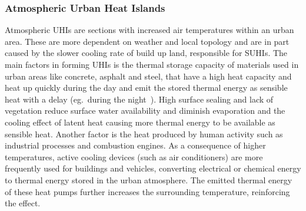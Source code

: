 \documentclass[12pt,a4paper, english,twoside]{scrartcl}
\begin{document}
    \subsubsection{Atmospheric Urban Heat Islands}\label{sec:at_uhi}
      Atmospheric \glspl{UHI} are sections with increased air temperatures within an urban area. 
      These are more dependent on weather and local topology and are in part caused by the slower cooling rate of build up land, responsible for \glspl{SUHI}.
      The main factors in forming \glspl{UHI} is the thermal storage capacity of materials used in urban areas like concrete, asphalt and steel, that have a high heat capacity and heat up quickly during the day and emit the stored thermal energy as sensible heat with a delay (eg.~during the night~\autocite{Ramamurthy2014}).
      High surface sealing and lack of vegetation reduce surface water availability and diminish evaporation and the cooling effect of latent heat causing more thermal energy to be available as sensible heat. 
      Another factor is the heat produced by human activity such as industrial processes and combustion engines.
      As a consequence of higher temperatures, active cooling devices (such as air conditioners) are more frequently used for buildings and vehicles, converting electrical or chemical energy to thermal energy stored in the urban atmosphere. 
      The emitted thermal energy of these heat pumps further increases the surrounding temperature, reinforcing the effect.
      \\
      
\end{document}
